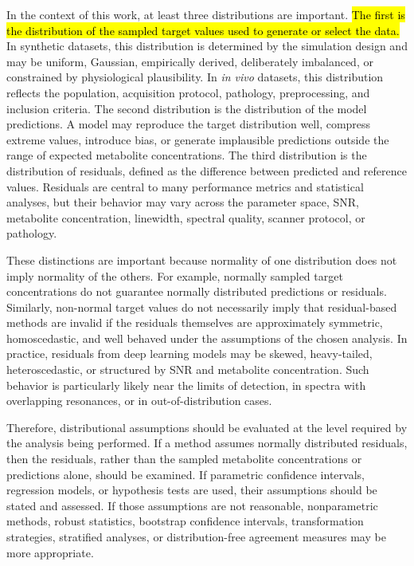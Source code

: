 In the context of this work, at least three distributions are important. \hl{The first is the distribution of the sampled target values used to generate or select the data.} In synthetic datasets, this distribution is determined by the simulation design and may be uniform, Gaussian, empirically derived, deliberately imbalanced, or constrained by physiological plausibility. In \textit{in vivo} datasets, this distribution reflects the population, acquisition protocol, pathology, preprocessing, and inclusion criteria. The second distribution is the distribution of the model predictions. A model may reproduce the target distribution well, compress extreme values, introduce bias, or generate implausible predictions outside the range of expected metabolite concentrations. The third distribution is the distribution of residuals, defined as the difference between predicted and reference values. Residuals are central to many performance metrics and statistical analyses, but their behavior may vary across the parameter space, SNR, metabolite concentration, linewidth, spectral quality, scanner protocol, or pathology.

These distinctions are important because normality of one distribution does not imply normality of the others. For example, normally sampled target concentrations do not guarantee normally distributed predictions or residuals. Similarly, non-normal target values do not necessarily imply that residual-based methods are invalid if the residuals themselves are approximately symmetric, homoscedastic, and well behaved under the assumptions of the chosen analysis. In practice, residuals from deep learning models may be skewed, heavy-tailed, heteroscedastic, or structured by SNR and metabolite concentration. Such behavior is particularly likely near the limits of detection, in spectra with overlapping resonances, or in out-of-distribution cases.

Therefore, distributional assumptions should be evaluated at the level required by the analysis being performed. If a method assumes normally distributed residuals, then the residuals, rather than the sampled metabolite concentrations or predictions alone, should be examined. If parametric confidence intervals, regression models, or hypothesis tests are used, their assumptions should be stated and assessed. If those assumptions are not reasonable, nonparametric methods, robust statistics, bootstrap confidence intervals, transformation strategies, stratified analyses, or distribution-free agreement measures may be more appropriate.

